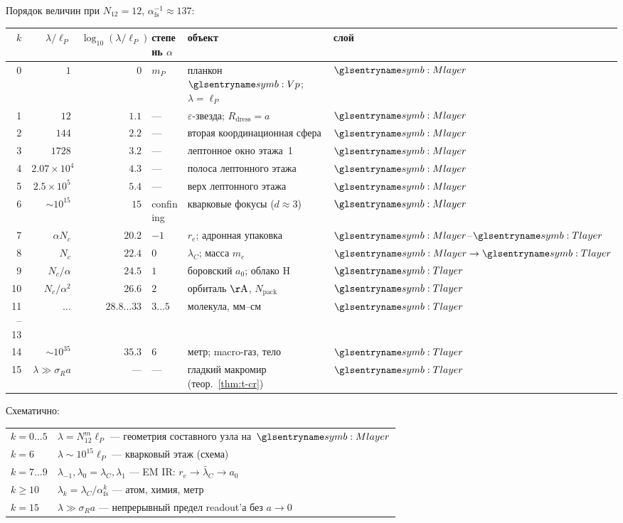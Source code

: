 \begin{proposition}
\label{prop:ladder-scale-steps}
Порядок величин при $N_{12}=12$, $\alpha_{\mathrm{fs}}^{-1}\approx 137$:

\smallskip
\begin{center}
\footnotesize
\setlength{\tabcolsep}{4pt}
\begin{tabular}{@{}r r r l l l@{}}
\toprule
$k$ & $\lambda/\ell_P$ & $\log_{10}(\lambda/\ell_P)$ & степень $\alpha$ & объект & слой \\
\midrule
0 & $1$ & $0$ & $m_P$ & планкон $\hv$; $\lambda=\ell_P$ & $\Mlayer$ \\
1 & $12$ & $1.1$ & --- & $\varepsilon$-звезда; $R_{\mathrm{dress}}=a$ & $\Mlayer$ \\
2 & $144$ & $2.2$ & --- & вторая координационная сфера & $\Mlayer$ \\
3 & $1728$ & $3.2$ & --- & лептонное окно этажа~1 & $\Mlayer$ \\
4 & $2.07\times 10^4$ & $4.3$ & --- & полоса лептонного этажа & $\Mlayer$ \\
5 & $2.5\times 10^5$ & $5.4$ & --- & верх лептонного этажа & $\Mlayer$ \\
6 & $\sim 10^{15}$ & $15$ & confining & кварковые фокусы ($d\approx 3$) & $\Mlayer$ \\
7 & $\alpha N_c$ & $20.2$ & $-1$ & $r_e$; адронная упаковка & $\Mlayer$--$\Tlayer$ \\
8 & $N_c$ & $22.4$ & $0$ & $\lambda_C$; масса $m_e$ & $\Mlayer\to\Tlayer$ \\
9 & $N_c/\alpha$ & $24.5$ & $1$ & боровский $a_0$; облако H & $\Tlayer$ \\
10 & $N_c/\alpha^2$ & $26.6$ & $2$ & орбиталь $\mathrm{\AA}$, $N_{\mathrm{pack}}$ & $\Tlayer$ \\
11--13 & $\ldots$ & $28.8\ldots 33$ & $3\ldots 5$ & молекула, мм--см & $\Tlayer$ \\
14 & $\sim 10^{35}$ & $35.3$ & $6$ & метр; macro-газ, тело & $\Tlayer$ \\
15 & $\lambda\gg\sigma_R a$ & --- & --- & гладкий макромир (теор.~\ref{thm:t-cr}) & $\Tlayer$ \\
\bottomrule
\end{tabular}
\end{center}
\end{proposition}

Схематично:
\begin{center}
\small
\begin{tabular}{@{}l@{\quad}l@{}}
$k=0\ldots 5$ & $\lambda=N_{12}^{m}\ell_P$ --- геометрия составного узла на~$\Mlayer$ \\
$k=6$ & $\lambda\sim 10^{15}\ell_P$ --- кварковый этаж (схема) \\
$k=7\ldots 9$ & $\lambda_{-1},\lambda_0=\lambda_C,\lambda_1$ --- EM IR: $r_e\to\bar\lambda_C\to a_0$ \\
$k\geq 10$ & $\lambda_k=\lambda_C/\alpha_{\mathrm{fs}}^{k}$ --- атом, химия, метр \\
$k=15$ & $\lambda\gg\sigma_R a$ --- непрерывный предел readout'а без $a\to 0$ \\
\end{tabular}
\end{center}

